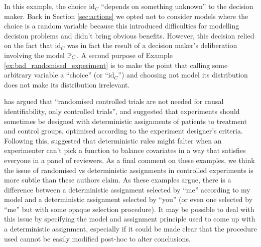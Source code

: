 In this example, the choice $\text{id}_C$ ``depends on something unknown'' to the decision maker. Back in Section \ref{sec:actions} we opted not to consider models where the choice is a random variable because this introduced difficulties for modelling decision problems and didn't bring obvious benefits. However, this decision relied on the fact that $\text{id}_C$ was in fact the result of a decision maker's deliberation involving the model $\mathbb{P}_C$. A second purpose of Example \ref{ex:bad_randomised_experiment} is to make the point that calling some arbitrary variable a ``choice'' (or ``$\text{id}_C$'') and choosing not model its distribution does not make its distribution irrelevant.

\citet{kasy_why_2016} has argued that ``randomised controlled trials are not needed for causal identifiability, only controlled trials'', and suggested that experiments should sometimes be designed with deterministic assignments of patients to treatment and control groups, optimised according to the experiment designer's criteria. Following this, \citet{banerjee_theory_2020} suggested that deterministic rules might falter when an experimenter can't pick a function to balance covariates in a way that satisfies everyone in a panel of reviewers. As a final comment on these examples, we think the issue of randomised vs deterministic assignments in controlled experiments is more subtle than these authors claim. As these examples argue, there is a difference between a deterministic assignment selected by ``me'' according to my model and a deterministic assignment selected by ``you'' (or even one selected by ``me'' but with some opaque selection procedure). It may be possible to deal with this issue by specifying the model and assignment principle used to come up with a deterministic assignment, especially if it could be made clear that the procedure used cannot be easily modified post-hoc to alter conclusions.


